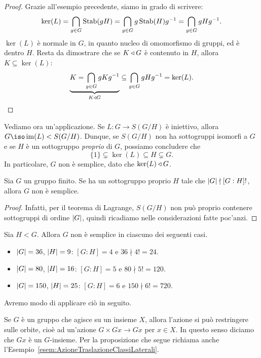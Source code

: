 \begin{proof}
Grazie all'esempio precedente, siamo in grado di scrivere:
\[ \ker(L)=\bigcap_{g\in G}\operatorname{Stab}(gH)=\bigcap_{g\in G}g\operatorname{Stab}(H)g^{-1}=\bigcap_{g\in G}gHg^{-1}.\]
$\ker(L)$ è normale in $G$, in quanto nucleo di omomorfismo di gruppi, ed è dentro $H$. Resta da dimostrare che se $K \triangleleft G$ è contenuto in $H$, allora $K \subseteq \ker(L)$:
\[\underbrace{K = \bigcap_{g\in G}gKg^{-1}}_{K \normal G} \subseteq \bigcap_{g\in G}gHg^{-1} = \ker(L) .\qedhere\]
\end{proof}

Vediamo ora un'applicazione. Se $L : G \to S(G/H)$ è iniettivo, allora $G \iso \im(L) < S(G/H)$. Dunque, se $S(G/H)$ non ha sottogruppi isomorfi a $G$ e se $H$ è un sottogruppo {\em proprio} di $G$, possiamo concludere che
\[ \{1\} \subsetneq \ker(L) \subseteq H \subsetneq G .\]
In particolare, $G$ non è semplice, dato che $\ker(L) \triangleleft G$.

\begin{coro}
Sia $G$ un gruppo finito. Se ha un sottogruppo proprio $H$ tale che $\left\lvert G\right\rvert\nmid[G:H]!$, allora $G$ non è semplice.
\end{coro}

\begin{proof}
Infatti, per il teorema di Lagrange, $S(G/H)$ non può proprio contenere sottogruppi di ordine $\left\lvert G\right\rvert$, quindi ricadiamo nelle considerazioni fatte poc'anzi.
\end{proof}

\begin{esem}
Sia $H<G$. Allora $G$ non è semplice in ciascuno dei seguenti casi.
\begin{itemize}
\item $\left\lvert G\right\rvert=36$, $\left\lvert H\right\rvert=9$: $[G:H]=4$ e $36\nmid4!=24$.
\item $\left\lvert G\right\rvert=80$, $\left\lvert H\right\rvert=16$: $[G:H]=5$ e $80\nmid5!=120$.
\item $\left\lvert G\right\rvert=150$, $\left\lvert H\right\rvert=25$: $[G:H]=6$ e $150\nmid6!=720$.
\end{itemize}
Avremo modo di applicare ciò in seguito.
\end{esem}



Se $G$ è un gruppo che agisce su un insieme $X$, allora l'azione si può restringere sulle orbite, cioè ad un'azione $G \times Gx \to Gx$ per $x \in X$. In questo senso diciamo che $Gx$ è un $G$-insieme. Per la proposizione che segue richiama anche l'Esempio~\ref{esem:AzioneTraslazioneClassiLaterali}.


